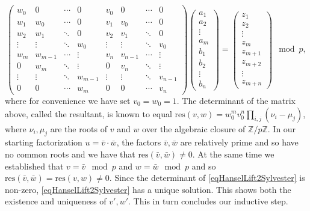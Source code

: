\documentclass{article}
\begin{document}
\begin{equation}\label{eqHanselLift2Sylvester}
\left( \begin{array}{ccccccccccc}
w_0    & 0       & \cdots & 0       & v_0    & 0       & \cdots & 0      \\
w_1    & w_0     & \cdots & 0       & v_1    & v_0     & \cdots & 0      \\
w_2    & w_1     & \ddots & 0       & v_2    & v_1     & \ddots & 0      \\
\vdots &\vdots   & \ddots & w_0     & \vdots &\vdots   & \ddots & v_0    \\
w_m    & w_{m-1} & \cdots & \vdots  & v_n    & v_{n-1} & \cdots & \vdots  \\
0      & w_m     & \ddots & \vdots  & 0      & v_n     & \ddots & \vdots  \\
\vdots & \vdots  & \ddots & w_{m-1} & \vdots & \vdots  & \ddots & v_{n-1} \\
0      & 0       & \cdots & w_m     & 0      & 0       & \cdots & v_n   

\end{array}\right) \begin{pmatrix}
a_1 \\
a_2\\
\vdots\\
a_m\\
b_1\\
b_2\\
\vdots \\
b_n
\end{pmatrix} = \begin{pmatrix}
z_1\\
z_2\\
\vdots
\\ 
z_m\\
z_{m+1} \\
z_{m+2} \\
\vdots \\
z_{m+n}

\end{pmatrix} \mod p,
\end{equation}
where for convenience we have set $v_0 = w_0=1$. The determinant of the matrix above, called the resultant, is known to equal \(\text{res}(v,w) = \displaystyle w_0^mv_0^n\prod_{i, j} \left(\nu_i-\mu_j \right)\), where $\nu_i, \mu_j$ are the roots of $v$ and $w$ over the algebraic closure of $\mathbb Z / p\mathbb Z$. In our starting factorization $u=\bar v\cdot \bar w $, the factors $\bar v, \bar w$ are relatively prime and so have no common roots and we have that $\text{res}(\bar v, \bar w)\neq 0$. At the same time we established that $v =\bar v \mod p$ and $w=\bar w\mod p $ and so $\text{res} (\bar v, \bar w) = \text{res}(v,w) \neq 0$. Since the determinant of \eqref{eqHanselLift2Sylvester} is non-zero, \eqref{eqHanselLift2Sylvester} has a unique solution. This shows both the existence and uniqueness of $v',w'$. This in turn concludes our inductive step.
\end{document}
